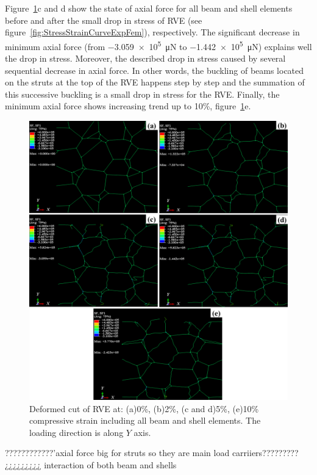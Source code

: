 \documentclass[review]{elsarticle}
\begin{document}
Figure~\ref{fig:RVEdeformedFaces}c and d show the state of axial force for all beam and shell elements before and after the small drop in stress of RVE (see figure~\ref{fig:StressStrainCurveExpFem}), respectively. The significant decrease in minimum axial force (from \SI{-3.059e5}{\micro\N} to \SI{-1.442e5}{\micro\N})  explains well the drop in stress. Moreover, the described drop in stress caused by several sequential decrease in axial force. In other words, the buckling of beams located on the struts at the top of the RVE happens step by step and the summation of this successive buckling is a small drop in stress for the RVE. Finally, the minimum axial force shows increasing trend up to 10\%, figure~\ref{fig:RVEdeformedFaces}e. 

 
\begin{figure}[hb]
  \centering
  \includegraphics[scale=0.35]{Deformed}
  \captionsetup{justification=centering}
  \caption{Deformed cut of RVE at: (a)0\%, (b)2\%, (c and d)5\%, (e)10\% compressive strain including all beam and shell elements. The loading direction is along $Y$ axis.}
  \label{fig:RVEdeformedFaces}
\end{figure}



????????????'axial force big for struts so they are main load carriiers?????????¿¿¿¿¿¿¿¿¿ interaction of both beam and shells  
\end{document}
